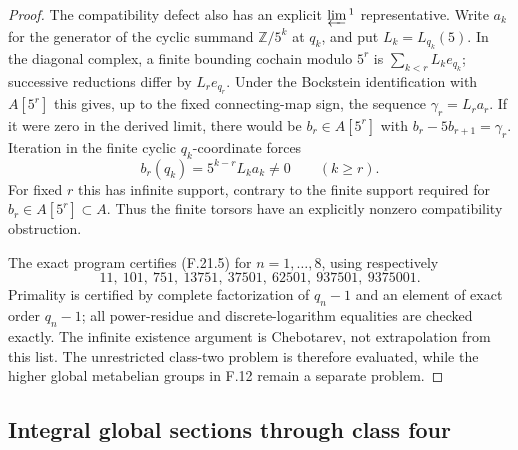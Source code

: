 \begin{proof}
The compatibility defect also has an explicit
$\varprojlim{}^1$ representative. Write $a_k$ for the
generator of the cyclic summand $\mathbb Z/5^k$ at
$q_k$, and put $L_k=L_{q_k}(5)$. In the diagonal
complex, a finite bounding cochain modulo $5^r$ is
$\sum_{k<r}L_k e_{q_k}$; successive reductions differ
by $L_r e_{q_r}$. Under the Bockstein identification
with $A[5^r]$ this gives, up to the fixed connecting-map
sign, the sequence $\gamma_r=L_r a_r$.
If it were zero in the derived limit, there would be
$b_r\in A[5^r]$ with $b_r-5b_{r+1}=\gamma_r$.
Iteration in the finite cyclic $q_k$-coordinate forces
\[
             b_r(q_k)=5^{k-r}L_k a_k\ne0
                         \qquad(k\ge r).
\]
For fixed $r$ this has infinite support, contrary to
the finite support required for $b_r\in A[5^r]\subset A$.
Thus the finite torsors have an explicitly nonzero
compatibility obstruction.

The exact program certifies (F.21.5) for $n=1,\ldots,8$,
using respectively
\[
 11,\ 101,\ 751,\ 13751,\ 37501,\ 62501,\
                        937501,\ 9375001.
\]
Primality is certified by complete factorization of
$q_n-1$ and an element of exact order $q_n-1$;
all power-residue and discrete-logarithm equalities
are checked exactly. The infinite existence argument
is Chebotarev, not extrapolation from this list.
The unrestricted class-two problem is therefore
evaluated, while the higher global metabelian groups
in F.12 remain a separate problem.
\end{proof}

\subsection{Integral global sections through class four}

